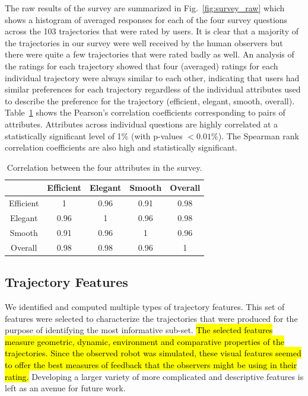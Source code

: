 \documentclass[letterpaper, 10 pt, conference]{ieeeconf}  %
\begin{document}
The raw results of the survey are summarized in Fig.~\ref{fig:survey_raw} which shows a histogram of averaged responses for each of the four survey questions across the 103 trajectories that were rated by users. It is clear that a majority of the trajectories in our survey were well received by the human observers but there were quite a few trajectories that were rated badly as well. An analysis of the ratings for each trajectory showed that four (averaged) ratings for each individual trajectory were always similar to each other, indicating that users had similar preferences for each trajectory regardless of the individual attributes used to describe the preference for the trajectory (efficient, elegant, smooth, overall). Table~\ref{tab:correlation} shows the Pearson's correlation coefficients corresponding to pairs of attributes. Attributes across individual questions are highly correlated at a statistically significant level of 1\% (with p-values $< 0.01\%$). The Spearman rank correlation coefficients are also high and statistically significant. 
\begin{table}
\centering
\begin{tabular}{|c|c|c|c|c|}
\hline
& Efficient & Elegant & Smooth & Overall \\ \hline
Efficient & 1 & 0.96 & 0.91 & 0.98 \\ \hline
Elegant & 0.96 & 1 & 0.96 & 0.98 \\ \hline
Smooth & 0.91 & 0.96 & 1 & 0.96 \\ \hline
Overall & 0.98 & 0.98 & 0.96 & 1 \\ \hline
\end{tabular}
\caption{Correlation between the four attributes in the survey.}
\label{tab:correlation}
\vspace{-0.1in}
\end{table}

\subsection{Trajectory Features}
\label{subsec:traj_feat}

We identified and computed multiple types of trajectory features. This set of features were selected to characterize the trajectories that were produced for the purpose of identifying the most informative sub-set. \hl{The selected features measure geometric, dynamic, environment and comparative properties of the trajectories. Since the observed robot was simulated, these visual features seemed to offer the best measures of feedback that the observers might be using in their rating.} Developing a larger variety of more complicated and descriptive features is left as an avenue for future work. 
\end{document}
